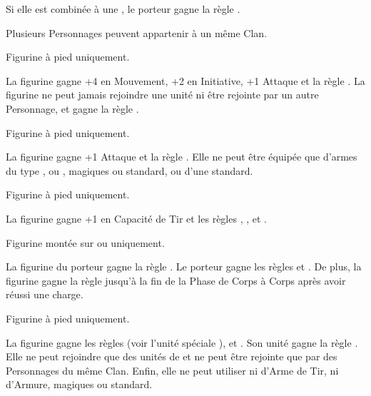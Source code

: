 \listitemonecol{\elvencloak} Si elle est combinée à une \la{}, le porteur gagne la règle .

\enditemlistonecol

\closearmyarmoury







\newpage
\begin{multicols}{2}\raggedcolumns
\startarmynewsection{\kindreds} %

\spaceaftersection{}

Plusieurs Personnages peuvent appartenir à un même Clan.

\startpricelistNSP

Figurine à pied uniquement.

La figurine gagne +4 en Mouvement, +2 en Initiative, +1 Attaque et la règle . La figurine ne peut jamais rejoindre une unité ni être rejointe par un autre Personnage, et gagne la règle \notaleader{}.

Figurine à pied uniquement.

La figurine gagne +1 Attaque et la règle . Elle ne peut être équipée que d'armes du type \spear{}, \gw{} ou \sylvanblades{}, magiques ou standard, ou d'une \hw{} standard.

Figurine à pied uniquement.

La figurine gagne +1 en Capacité de Tir et les règles \scout{}, \masterarcher{}, et . %

Figurine montée sur \elvenhorse{} ou \greatelk{} uniquement.

La figurine du porteur gagne la règle \frenzy{}. Le porteur gagne les règles \devastatingcharge{} et \lighttroops{}. De plus, la figurine gagne la règle \fear{} jusqu'à la fin de la Phase de Corps à Corps après avoir réussi une charge.

Figurine à pied uniquement.

La figurine gagne les règles \dancesofcenyrn{} (voir l'unité spéciale \bladedancers{}), \immunetopsychology{} et . Son unité gagne la règle \swiftstride{}. Elle ne peut rejoindre que des unités de \bladedancers{} et ne peut être rejointe que par des Personnages du même Clan. Enfin, elle ne peut utiliser ni d'Arme de Tir, ni d'Armure, magiques ou standard.


\end{multicols}

